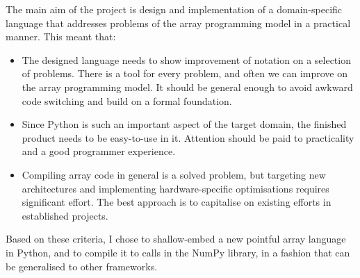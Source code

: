 The main aim of the project is design and implementation of a domain-specific language that addresses problems of the array programming model in a practical manner. This meant that:
\begin{itemize}
    \item The designed language needs to show improvement of notation on a selection of problems. There is a tool for every problem, and often we can improve on the array programming model. It should be general enough to avoid awkward code switching and build on a formal foundation.
    \item Since Python is such an important aspect of the target domain, the finished product needs to be easy-to-use in it. Attention should be paid to practicality and a good programmer experience.
    \item Compiling array code in general is a solved problem, but targeting new architectures and implementing hardware-specific optimisations requires significant effort. The best approach is to capitalise on existing efforts in established projects.
\end{itemize}
Based on these criteria, I chose to shallow-embed a new pointful array language in Python, and to compile it to calls in the NumPy library, in a fashion that can be generalised to other frameworks.